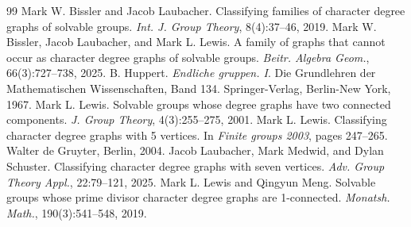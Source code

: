 \documentclass[10pt,a4paper]{amsart}
\begin{document}
\begin{thebibliography}{99}
 Mark W. Bissler and Jacob Laubacher. Classifying families of character degree graphs of solvable groups. \emph{Int. J. Group Theory}, 8(4):37--46, 2019.
 Mark W. Bissler, Jacob Laubacher, and Mark L. Lewis. A family of graphs that cannot occur as character degree graphs of solvable groups. \emph{Beitr. Algebra Geom.}, 66(3):727--738, 2025.
 B. Huppert. \emph{Endliche gruppen. I}. Die Grundlehren der Mathematischen Wissenschaften, Band 134. Springer-Verlag, Berlin-New York, 1967.
 Mark L. Lewis. Solvable groups whose degree graphs have two connected components. \emph{J. Group Theory}, 4(3):255--275, 2001.
 Mark L. Lewis. Classifying character degree graphs with 5 vertices. In \emph{Finite groups 2003}, pages 247--265. Walter de Gruyter, Berlin, 2004.
 Jacob Laubacher, Mark Medwid, and Dylan Schuster. Classifying character degree graphs with seven vertices. \emph{Adv. Group Theory Appl.}, 22:79--121, 2025.
 Mark L. Lewis and Qingyun Meng. Solvable groups whose prime divisor character degree graphs are 1-connected. \emph{Monatsh. Math.}, 190(3):541--548, 2019.
\end{thebibliography}
\end{document}
